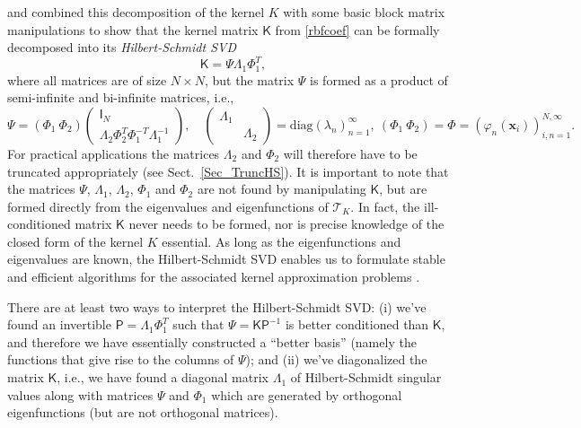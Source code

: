 \documentclass[11pt]{NSFamsart}
\newcommand{\mI}{\mathsf{I}}
\newcommand{\mK}{\mathsf{K}}
\newcommand{\mP}{\mathsf{P}}
\newcommand{\mPhi}{\mathsf{\Phi}}
\newcommand{\mPsi}{\mathsf{\Psi}}
\newcommand{\mLambda}{\mathsf{\Lambda}}
\newcommand{\bx}{{\boldsymbol{x}}}
\newcommand{\cT}{\mathcal{T}}
\begin{document}
\cite{FMcC12} and \cite{CFMcC13} combined this decomposition of the kernel $K$ with some basic block matrix manipulations to show that the kernel matrix $\mK$ from \eqref{rbfcoef} can be formally decomposed into its \emph{Hilbert-Schmidt SVD}
\[
\mK = \mPsi \mLambda_1 \mPhi_1^T,
\]
where all matrices are of size $N\times N$, but the matrix $\mPsi$ is formed as a product of semi-infinite and bi-infinite matrices, i.e.,
\begin{equation}\label{StableBasis}
\mPsi = \left(\mPhi_1\ \mPhi_2\right)\left(\begin{matrix}\mI_N\\\mLambda_2\mPhi_2^T\mPhi_1^{-T}\mLambda_1^{-1}\end{matrix}\right),
\quad
\left(\begin{matrix}\mLambda_1 & \\ & \mLambda_2\end{matrix}\right) = \text{diag}(\lambda_n)_{n=1}^\infty,\ \left(\mPhi_1\ \mPhi_2\right) = \mPhi = \left(\varphi_n(\bx_i)\right)_{i,n=1}^{N,\infty}.
\end{equation}
For practical applications the matrices $\mLambda_2$ and $\mPhi_2$ will therefore have to be truncated appropriately (see Sect.~\ref{Sec_TruncHS}). It is important to note that the matrices $\mPsi$, $\mLambda_1$, $\mLambda_2$, $\mPhi_1$ and $\mPhi_2$ are not found by manipulating $\mK$, but are formed directly from the eigenvalues and eigenfunctions of $\cT_K$. In fact, the ill-conditioned matrix $\mK$ never needs to be formed, nor is precise knowledge of the closed form of the kernel $K$ essential. As long as the eigenfunctions and eigenvalues are known, the Hilbert-Schmidt SVD enables us to formulate stable and efficient algorithms for the associated kernel approximation problems \citep{CFMcC13}.

There are at least two ways to interpret the Hilbert-Schmidt SVD:
(i) we've found an invertible $\mP = \mLambda_1\mPhi_1^T$ such that $\mPsi=\mK\mP^{-1}$ is better conditioned than $\mK$, and therefore we have essentially constructed a ``better basis'' (namely the functions that give rise to the columns of $\mPsi$); and
(ii) we've diagonalized the matrix $\mK$, i.e., we have found a diagonal matrix $\mLambda_1$ of Hilbert-Schmidt singular values along with matrices $\mPsi$ and $\mPhi_1$ which are generated by orthogonal eigenfunctions (but are not orthogonal matrices).
\end{document}
